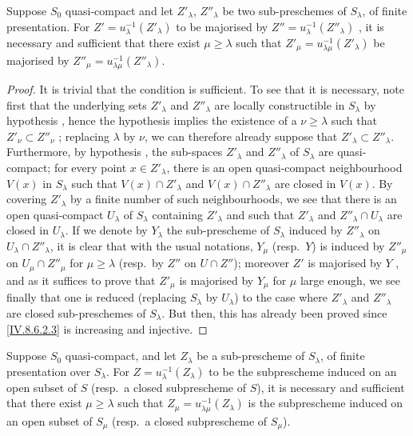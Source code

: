 \begin{corollary}[8.6.3.1]
\label{IV.8.6.3.1}
Suppose $S_0$ quasi-compact and let $Z'_\lambda$, $Z''_\lambda$ be two sub-preschemes of $S_\lambda$, of finite presentation.
For $Z'=u_\lambda^{-1}(Z'_\lambda)$ to be majorised by $Z''=u_\lambda^{-1}(Z''_\lambda)$ , it is necessary and sufficient that there exist $\mu\geqslant\lambda$ such that $Z'_\mu=u_{\lambda\mu}^{-1}(Z'_\lambda)$ be majorised by $Z''_\mu=u_{\lambda\mu}^{-1}(Z''_\lambda)$.
\end{corollary}

\begin{proof}
It is trivial that the condition is sufficient.
To see that it is necessary, note first that the underlying sets $Z'_\lambda$ and $Z''_\lambda$ are locally constructible in $S_\lambda$ by hypothesis , hence the hypothesis implies the existence of a $\nu\geqslant\lambda$ such that $Z'_\nu\subset Z''_\nu$ ; replacing $\lambda$ by $\nu$, we can therefore already suppose that $Z'_\lambda\subset Z''_\lambda$.
Furthermore, by hypothesis , the sub-spaces $Z'_\lambda$ and $Z''_\lambda$ of $S_\lambda$ are quasi-compact; for every point $x\in Z'_\lambda$, there is an open quasi-compact neighbourhood $V(x)$ in $S_\lambda$ such that $V(x)\cap Z'_\lambda$ and $V(x)\cap Z''_\lambda$ are closed in $V(x)$.
By covering $Z'_\lambda$ by a finite number of such neighbourhoods, we see that there is an open quasi-compact $U_\lambda$ of $S_\lambda$ containing $Z'_\lambda$ and such that $Z'_\lambda$ and $Z''_\lambda\cap U_\lambda$ are closed in $U_\lambda$.
If we denote by $Y_\lambda$ the sub-prescheme of $S_\lambda$ induced by $Z''_\lambda$ on $U_\lambda\cap Z''_\lambda$, it is clear that with the usual notations, $Y_\mu$ (resp.\ $Y$) is induced by $Z''_\mu$ on $U_\mu\cap Z''_\mu$ for $\mu\geqslant\lambda$ (resp.\ by $Z''$ on $U\cap Z''$); moreover $Z'$ is majorised by $Y$ , and as it suffices to prove that $Z'_\mu$ is majorised by $Y_\mu$ for $\mu$
large enough, we see finally that one is reduced (replacing $S_\lambda$ by $U_\lambda$) to the case where $Z'_\lambda$ and $Z''_\lambda$ are closed sub-preschemes of $S_\lambda$.
But then, this has already been proved since \eqref{IV.8.6.2.3} is increasing and injective.
\end{proof}

\begin{corollary}[8.6.4]
\label{IV.8.6.4}
Suppose $S_0$ quasi-compact, and let $Z_\lambda$ be a sub-prescheme of $S_\lambda$, of finite presentation over $S_\lambda$.
For $Z=u_\lambda^{-1}(Z_\lambda)$ to be the subprescheme induced on an open subset of $S$ (resp.\ a closed subprescheme of $S$), it is necessary and sufficient that there exist $\mu\geqslant\lambda$ such that $Z_\mu=u_{\lambda\mu}^{-1}(Z_\lambda)$ is the subprescheme induced on an open subset of $S_\mu$ (resp.\ a closed subprescheme of $S_\mu$).
\end{corollary}


